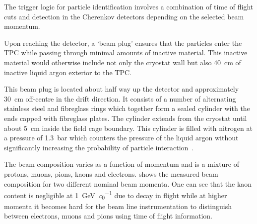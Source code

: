 The trigger logic for particle identification involves a combination of time of flight cuts and detection in the Cherenkov detectors depending on the selected beam momentum.

Upon reaching the detector, a `beam plug' ensures that the particles enter the TPC while passing through minimal amounts of inactive material.
This inactive material would otherwise include not only the cryostat wall but also \SI{40}{\cm} of inactive liquid argon exterior to the TPC.

This beam plug is located about half way up the detector and approximately \SI{30}{\cm} off-centre in the drift direction.
It consists of a number of alternating stainless steel and fibreglass rings which together form a sealed cylinder with the ends capped with fibreglass plates.
The cylinder extends from the cryostat until about \SI{5}{\cm} inside the field cage boundary.
This cylinder is filled with nitrogen at a pressure of \SI{1.3}{\bar} which counters the pressure of the liquid argon without significantly increasing the probability of particle interaction~\cite{protodunePerformance}.

The beam composition varies as a function of momentum and is a mixture of protons, muons, pions, kaons and electrons.
 shows the measured beam composition for two different nominal beam momenta.
One can see that the kaon content is negligible at \SI{1}{\GeV\per\clight} due to decay in flight while at higher momenta it becomes hard for the beam line instrumentation to distinguish between electrons, muons and pions using time of flight information.


